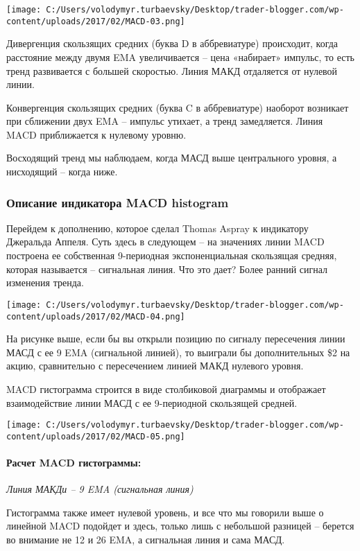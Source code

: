 \documentclass[a5paper]{article}
\begin{document}
\texttt{[image: C:/Users/volodymyr.turbaevsky/Desktop/trader-blogger.com/wp-content/uploads/2017/02/MACD-03.png]}

Дивергенция скользящих средних (буква D в аббревиатуре) происходит, когда расстояние между двумя EMA увеличивается – цена «набирает» импульс, то есть тренд развивается с большей скоростью. Линия МАКД отдаляется от нулевой линии.

Конвергенция скользящих средних (буква C в аббревиатуре) наоборот возникает при сближении двух EMA – импульс утихает, а тренд замедляется. Линия MACD приближается к нулевому уровню.

Восходящий тренд мы наблюдаем, когда МАСД выше центрального уровня, а
нисходящий – когда ниже.

\subsubsection{Описание индикатора MACD histogram}

Перейдем к дополнению, которое сделал Thomas Aspray к индикатору
Джеральда Аппеля. Суть здесь в следующем – на значениях линии MACD
построена ее собственная 9-периодная экспоненциальная скользящая
средняя, которая называется – сигнальная линия. Что это дает? Более
ранний сигнал изменения тренда.

\texttt{[image: C:/Users/volodymyr.turbaevsky/Desktop/trader-blogger.com/wp-content/uploads/2017/02/MACD-04.png]}

На рисунке выше, если бы вы открыли позицию по сигналу пересечения линии МАСД с ее 9 EMA (сигнальной линией), то выиграли бы дополнительных \$2 на акцию, сравнительно с пересечением линией МАКД нулевого уровня.

MACD гистограмма строится в виде столбиковой диаграммы и отображает
взаимодействие линии МАСД с ее 9-периодной скользящей средней.

\texttt{[image: C:/Users/volodymyr.turbaevsky/Desktop/trader-blogger.com/wp-content/uploads/2017/02/MACD-05.png]}

\paragraph{Расчет MACD гистограммы:}

    \emph{Линия МАКДи – 9 EMA (сигнальная линия)}

Гистограмма также имеет нулевой уровень, и все что мы говорили выше о линейной MACD подойдет и здесь, только лишь с небольшой разницей – берется во внимание не 12 и 26 EMA, а сигнальная линия и сама МАСД.
\end{document}
